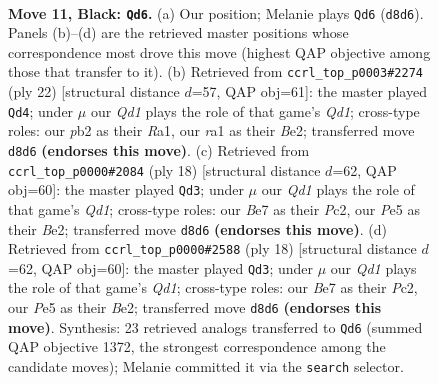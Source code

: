 \documentclass[11pt]{article}
\begin{document}
\clearpage

\begin{figure}[p]\centering
\begin{subfigure}{0.46\textwidth}\centering
\resizebox{\linewidth}{!}{%
\newchessgame
\chessboard[
  setfen={1r1q1rk1/ppp1bppp/1nn1b2P/4p3/P3P3/2N2NP1/1P1P1PB1/R1BQK2R b KQ - 0 11},
  showmover=false,
  pgfstyle=straightmove, color=movearrow, markmove={d8-d6}
]}
\caption{}
\end{subfigure}\hfill
\begin{subfigure}{0.46\textwidth}\centering
\resizebox{\linewidth}{!}{%
\newchessgame
\chessboard[
  setfen={r2qk2r/1b2bppp/pp1ppn2/4n3/2P1P3/N1N1B3/PP2BPPP/R2Q1RK1 w kq - 4 12},
  showmover=false,
  pgfstyle=straightmove, color=movearrow, markmove={d1-d4}
]}
\caption{}
\end{subfigure}
\\[4pt]
\begin{subfigure}{0.46\textwidth}\centering
\resizebox{\linewidth}{!}{%
\newchessgame
\chessboard[
  setfen={rn1q1rk1/1p2bppp/p2pbn2/4p3/4P3/1NN1B3/PPP1BPPP/R2Q1RK1 w - - 6 10},
  showmover=false,
  pgfstyle=straightmove, color=movearrow, markmove={d1-d3}
]}
\caption{}
\end{subfigure}\hfill
\begin{subfigure}{0.46\textwidth}\centering
\resizebox{\linewidth}{!}{%
\newchessgame
\chessboard[
  setfen={rn1q1rk1/1p2bppp/p2pbn2/4p3/4P3/1NN1B3/PPP1BPPP/R2Q1RK1 w - - 6 10},
  showmover=false,
  pgfstyle=straightmove, color=movearrow, markmove={d1-d3}
]}
\caption{}
\end{subfigure}
\caption{\textbf{Move 11, Black: \texttt{Qd6}.} (a) Our position; Melanie plays \texttt{Qd6} (\texttt{d8d6}). Panels (b)--(d) are the retrieved master positions whose correspondence most drove this move (highest QAP objective among those that transfer to it). (b) Retrieved from \texttt{ccrl\_top\_p0003\#2274} (ply 22) [structural distance $d$=57, QAP obj=61]: the master played \texttt{Qd4}; under $\mu$ our \emph{Qd1} plays the role of that game's \emph{Qd1}; cross-type roles: our \emph{p}b2 as their \emph{R}a1, our \emph{r}a1 as their \emph{B}e2; transferred move \texttt{d8d6} \textbf{(endorses this move)}. (c) Retrieved from \texttt{ccrl\_top\_p0000\#2084} (ply 18) [structural distance $d$=62, QAP obj=60]: the master played \texttt{Qd3}; under $\mu$ our \emph{Qd1} plays the role of that game's \emph{Qd1}; cross-type roles: our \emph{B}e7 as their \emph{P}c2, our \emph{P}e5 as their \emph{B}e2; transferred move \texttt{d8d6} \textbf{(endorses this move)}. (d) Retrieved from \texttt{ccrl\_top\_p0000\#2588} (ply 18) [structural distance $d$=62, QAP obj=60]: the master played \texttt{Qd3}; under $\mu$ our \emph{Qd1} plays the role of that game's \emph{Qd1}; cross-type roles: our \emph{B}e7 as their \emph{P}c2, our \emph{P}e5 as their \emph{B}e2; transferred move \texttt{d8d6} \textbf{(endorses this move)}. Synthesis: 23 retrieved analogs transferred to \texttt{Qd6} (summed QAP objective 1372, the strongest correspondence among the candidate moves); Melanie committed it via the \texttt{search} selector.}
\label{fig:thought-m21}
\end{figure}
\end{document}
